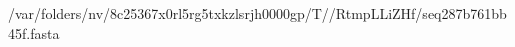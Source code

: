 \documentclass[10pt]{article}
\begin{document}
\begin{texshade}{/var/folders/nv/8c25367x0rl5rg5txkzlsrjh0000gp/T//RtmpLLiZHf/seq287b761bb45f.fasta}
\hidelogoscale
\hidenames
{}
\end{texshade}
\end{document}

